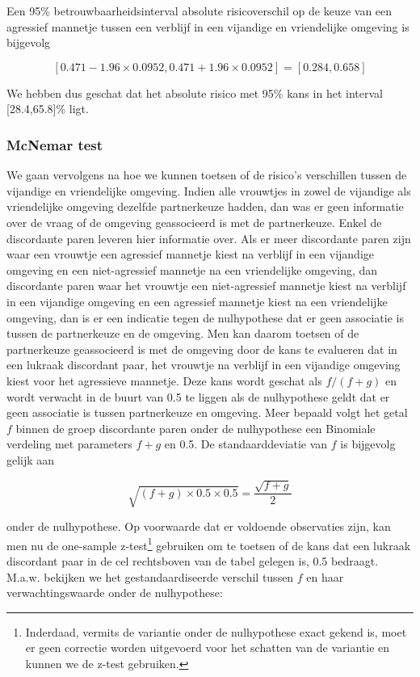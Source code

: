 \documentclass[
  12pt,dutch,coursenotes]{book}
\theoremstyle{definition}
\theoremstyle{definition}
\theoremstyle{definition}
\theoremstyle{definition}
\theoremstyle{remark}
\begin{document}
Een 95\% betrouwbaarheidsinterval absolute risicoverschil op de keuze van een agressief mannetje tussen een verblijf in een vijandige en vriendelijke omgeving is bijgevolg

\begin{equation*}
\left[0.471-1.96\times 0.0952,0.471+1.96\times 0.0952\right]=[0.284,0.658]
\end{equation*}

We hebben dus geschat dat het absolute risico met 95\% kans in het interval {[}28.4,65.8{]}\% ligt.

\hypertarget{mcnemar-test}{%
\subsubsection{McNemar test}\label{mcnemar-test}}

We gaan vervolgens na hoe we kunnen toetsen of de risico's verschillen tussen de vijandige en vriendelijke omgeving.
Indien alle vrouwtjes in zowel de vijandige als vriendelijke omgeving dezelfde partnerkeuze hadden, dan was er geen informatie over de vraag of de omgeving geassocieerd is met de partnerkeuze. Enkel de discordante paren leveren hier informatie over. Als
er meer discordante paren zijn waar een vrouwtje een agressief mannetje kiest na verblijf in een vijandige omgeving en een niet-agressief mannetje na een vriendelijke omgeving, dan discordante paren waar het vrouwtje een niet-agressief mannetje kiest na verblijf in een vijandige omgeving en een agressief mannetje kiest na een vriendelijke omgeving, dan is er een
indicatie tegen de nulhypothese dat er geen associatie is tussen de partnerkeuze en de omgeving.
Men kan daarom toetsen of de partnerkeuze geassocieerd is met de omgeving door de kans te evalueren dat in een
lukraak discordant paar, het vrouwtje na verblijf in een vijandige omgeving kiest voor het agressieve mannetje.
Deze kans wordt geschat als \(f/(f+g)\) en wordt verwacht in de buurt
van 0.5 te liggen als de nulhypothese geldt dat er geen associatie is tussen partnerkeuze en omgeving.
Meer bepaald volgt het getal \(f\) binnen de
groep discordante paren onder de nulhypothese een Binomiale verdeling met
parameters \(f+g\) en 0.5. De standaarddeviatie van \(f\) is bijgevolg gelijk
aan

\begin{equation*}
\sqrt{(f+g)\times 0.5\times 0.5}=\frac{\sqrt{f+g}}{2}
\end{equation*}

onder de nulhypothese. Op voorwaarde dat er voldoende observaties zijn, kan men nu de one-sample z-test\footnote{Inderdaad, vermits de variantie onder de nulhypothese exact gekend is, moet er geen correctie worden uitgevoerd voor het schatten van de variantie en kunnen we de z-test gebruiken.}
gebruiken om te toetsen of de kans dat een lukraak discordant paar in de cel rechtsboven van de tabel
gelegen is, 0.5 bedraagt. M.a.w. bekijken we het gestandaardiseerde verschil
tussen \(f\) en haar verwachtingswaarde onder de nulhypothese:
\end{document}

